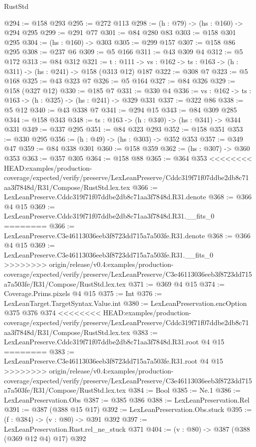 \begin{lexlean}{RustStd}
\begin{coremodule}
{\begin{coremodule}
@294 := @158 @293
@295 := @272 @113
@298 := (h : @79) -> (hs : @160) -> @294 @295
@299 := @291 @77
@301 := @84 @280 @83
@303 := @158 @301 @295
@304 := (hs : @160) -> @303
@305 := @299 @157
@307 := @158 @86 @295
@308 := @237 @6
@309 := @5 @166
@311 := @43 @309 @4
@312 := @5 @172
@313 := @84 @312
@321 := {t : @111} ->
  {vs : @162} -> {ts : @163} -> (h : @311) -> (hs : @241) -> @158 (@313 @12) @187
@322 := @308 @7
@323 := @5 @168
@325 := @43 @323 @7
@326 := @5 @164
@327 := @84 @326
@329 := @158 (@327 @12)
@330 := @185 @7
@331 := @330 @4
@336 := {vs : @162} -> {ts : @163} -> (h : @325) -> (hs : @241) -> @329 @331
@337 := @322 @86
@338 := @5 @12
@340 := @43 @338 @7
@341 := @294 @15
@343 := @84 @309 @285
@344 := @158 @343
@348 := {ts : @163} -> (h : @340) -> (hs : @341) -> @344 @331
@349 := @337 @295
@351 := @84 @323 @293
@352 := @158 @351
@353 := @330 @295
@356 := (h : @49) -> (hs : @303) -> @352 @353
@357 := @349 @47
@359 := @84 @338 @301
@360 := @158 @359
@362 := (hs : @307) -> @360 @353
@363 := @357 @305
@364 := @158 @88
@365 := @364 @353
<<<<<<<< HEAD:examples/production-coverage/expected/verify/preserve/LexLeanPreserve/Cddc319f71f07ddbe2db8c71aa3f7848d/R31/Compose/RustStd.lex.tex
@366 := LexLeanPreserve.Cddc319f71f07ddbe2db8c71aa3f7848d.R31.denote
@368 := @366 @4 @15
@369 := LexLeanPreserve.Cddc319f71f07ddbe2db8c71aa3f7848d.R31.__fits_0
========
@366 := LexLeanPreserve.C3e46113036eeb3f8723dd715a7a503fe.R31.denote
@368 := @366 @4 @15
@369 := LexLeanPreserve.C3e46113036eeb3f8723dd715a7a503fe.R31.__fits_0
>>>>>>>> origin/release/v0.4:examples/production-coverage/expected/verify/preserve/LexLeanPreserve/C3e46113036eeb3f8723dd715a7a503fe/R31/Compose/RustStd.lex.tex
@371 := @369 @4 @15
@374 := Coverage.Prims.pixels @4 @15
@375 := Int
@376 := LexLeanTarget.TargetSyntax.Value.int
@380 := LexLeanPreservation.encOption @375 @376 @374
<<<<<<<< HEAD:examples/production-coverage/expected/verify/preserve/LexLeanPreserve/Cddc319f71f07ddbe2db8c71aa3f7848d/R31/Compose/RustStd.lex.tex
@383 := LexLeanPreserve.Cddc319f71f07ddbe2db8c71aa3f7848d.R31.root @4 @15
========
@383 := LexLeanPreserve.C3e46113036eeb3f8723dd715a7a503fe.R31.root @4 @15
>>>>>>>> origin/release/v0.4:examples/production-coverage/expected/verify/preserve/LexLeanPreserve/C3e46113036eeb3f8723dd715a7a503fe/R31/Compose/RustStd.lex.tex
@384 := Bool
@385 := Ne.{1}
@386 := LexLeanPreservation.Obs
@387 := @385 @386
@388 := LexLeanPreservation.Rel
@391 := @387 (@388 @15 @17)
@392 := LexLeanPreservation.Obs.stuck
@395 := (f : @384) -> (v : @80) -> @391 @392
@397 := LexLeanPreservation.Rust.rel_ne_stuck @371
@404 := (v : @80) -> @387 (@388 (@369 @12 @4) @17) @392

\end{coremodule}}
\end{coremodule}
\end{lexlean}
